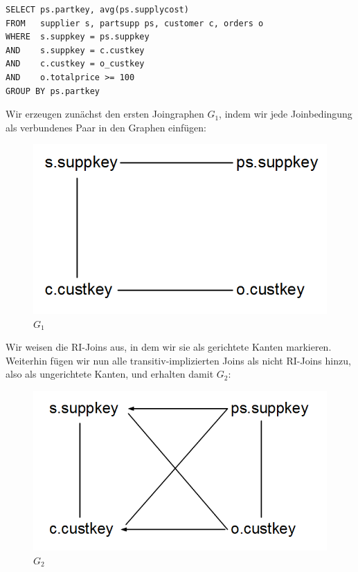 \begin{lstlisting}[mathescape]
SELECT ps.partkey, avg(ps.supplycost)
FROM   supplier s, partsupp ps, customer c, orders o
WHERE  s.suppkey = ps.suppkey 
AND    s.suppkey = c.custkey
AND    c.custkey = o_custkey
AND    o.totalprice >= 100
GROUP BY ps.partkey
\end{lstlisting}

Wir erzeugen zunächst den ersten Joingraphen $G_1$, indem wir jede Joinbedingung als verbundenes Paar in den Graphen einfügen:

\begin{figure}[H]
\centering
\includegraphics[scale=0.4]{Bilder/joinelem_g1.png}
\caption{$G_1$}
\end{figure}

Wir weisen die RI-Joins aus, in dem wir sie als gerichtete Kanten markieren. Weiterhin fügen wir nun alle transitiv-implizierten Joins als nicht RI-Joins hinzu, also als ungerichtete Kanten, und erhalten damit $G_2$:

\begin{figure}[H]
\centering
\includegraphics[scale=0.4]{Bilder/joinelem_g2.png}
\caption{$G_2$}
\end{figure}

